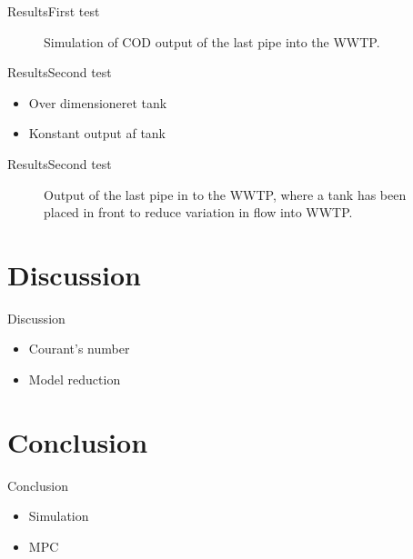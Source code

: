 \begin{frame}{Results}{First test}
\begin{figure}[H]
\centering

\caption{Simulation of COD output of the last pipe into the WWTP.}
\label{fig:simulation_output_first_concentration}
\end{figure}    
\end{frame}

\begin{frame}{Results}{Second test}
    
\begin{itemize}
	\item Over dimensioneret tank
	\item Konstant output af tank
\end{itemize}

\end{frame}


\begin{frame}{Results}{Second test}
\begin{figure}[H]
\centering

\caption{Output of the last pipe in to the WWTP, where a tank has been placed in front to reduce variation in flow into WWTP.}
\label{fig:simulation_output_second}
\end{figure} 
\end{frame}


\section{Discussion}
\begin{frame}{Discussion}{}
\begin{itemize}
	\item Courant's number
	\item Model reduction
\end{itemize}
\end{frame}

\section{Conclusion}

\begin{frame}{Conclusion}{}
\begin{itemize}
    	\item Simulation
    	\item MPC
\end{itemize}    


\end{frame}

